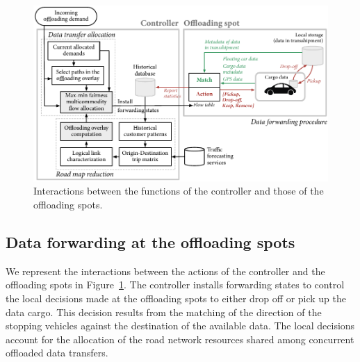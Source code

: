\begin{figure}[t]
	\centering
		\includegraphics[width=\columnwidth]{figures/controller-flowchart-offloading-spot.pdf}
	\caption{Interactions between the functions of the controller and those of the offloading spots.}
	\label{fig:controller-flowchart}
\end{figure}


\subsection{Data forwarding at the offloading spots}
\label{sec:data-forwarding-offloading-spot}

We represent the interactions between the actions of the controller and the offloading spots in Figure~\ref{fig:controller-flowchart}. The controller installs forwarding states to control the local decisions made at the offloading spots to either drop off or pick up the data cargo. This decision results from the matching of the direction of the stopping vehicles against the destination of the available data. The local decisions account for the allocation of the road network resources shared among concurrent offloaded data transfers.

\clearpage

